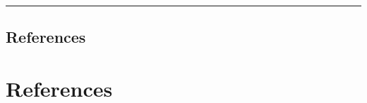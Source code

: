 \documentclass[]{book}
\begin{document}
\begin{center}\rule{0.5\linewidth}{\linethickness}\end{center}

\hypertarget{references-8}{%
\section{References}\label{references-8}}

\hypertarget{References}{%
\chapter{References}\label{References}}


\end{document}
